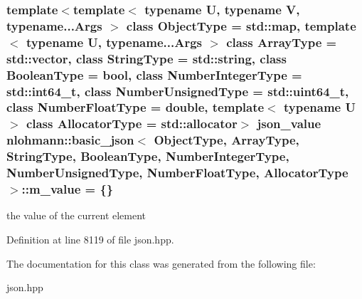\subsubsection[{m\+\_\+value}]{\setlength{\rightskip}{0pt plus 5cm}template$<$template$<$ typename U, typename V, typename...\+Args $>$ class Object\+Type = std\+::map, template$<$ typename U, typename...\+Args $>$ class Array\+Type = std\+::vector, class String\+Type  = std\+::string, class Boolean\+Type  = bool, class Number\+Integer\+Type  = std\+::int64\+\_\+t, class Number\+Unsigned\+Type  = std\+::uint64\+\_\+t, class Number\+Float\+Type  = double, template$<$ typename U $>$ class Allocator\+Type = std\+::allocator$>$ {\bf json\+\_\+value} {\bf nlohmann\+::basic\+\_\+json}$<$ Object\+Type, Array\+Type, String\+Type, Boolean\+Type, Number\+Integer\+Type, Number\+Unsigned\+Type, Number\+Float\+Type, Allocator\+Type $>$\+::m\+\_\+value = \{\}\hspace{0.3cm}{\ttfamily [private]}}\label{classnlohmann_1_1basic__json_a7d014eac0fb6ffaeceee0171ffa0df45}


the value of the current element 



Definition at line 8119 of file json.\+hpp.



The documentation for this class was generated from the following file\+:\begin{DoxyCompactItemize}
\item 
json.\+hpp\end{DoxyCompactItemize}
